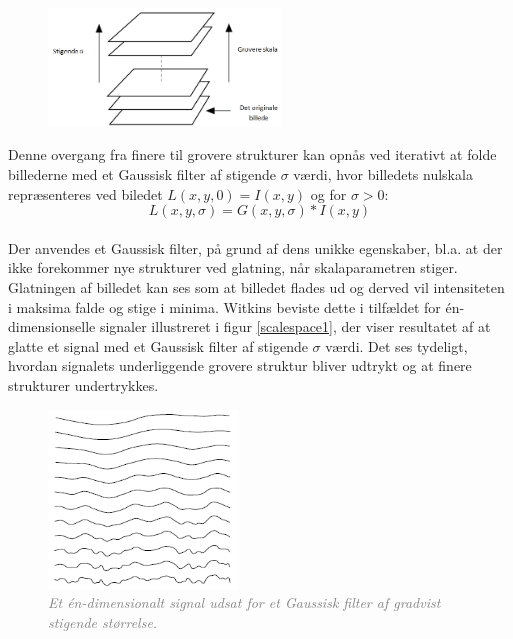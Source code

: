 \begin{figure}[H]
    \centering
    \includegraphics[width=0.55\textwidth]{fig/32.png}
     \vspace{-1em}
    \begin{center}    
       \caption{\textcolor{gray}{\footnotesize \textit{ }}}
    \label{fig:scalerep}
     \end{center}
     \vspace{-2.5em}
  \end{figure} \noindent
Denne overgang fra finere til grovere strukturer kan opnås ved iterativt at folde billederne med et Gaussisk filter af stigende $\sigma$ værdi, hvor billedets nulskala repræsenteres ved biledet $ L(x,y,0) = I(x,y)$ og for $\sigma>0$:
\begin{equation}
L(x,y,\sigma) = G(x,y,\sigma)\ast I(x,y)
\label{scalespace1}
\end{equation}
\\
Der anvendes et Gaussisk filter, på grund af dens unikke egenskaber,  bl.a. at der ikke forekommer nye strukturer ved glatning, når skalaparametren stiger. Glatningen af billedet kan ses som at billedet flades ud og derved vil intensiteten i maksima falde og stige i minima.  Witkins \cite{witkins} beviste dette i tilfældet for én-dimensionselle signaler illustreret i  figur  \ref{scalespace1}, der viser resultatet af at glatte et signal med et Gaussisk filter af stigende $\sigma$ værdi. Det ses tydeligt, hvordan signalets underliggende grovere struktur bliver udtrykt og at finere strukturer undertrykkes.
\begin{figure}[H]
    \centering
    \includegraphics[width=0.45\textwidth]{fig/33.png}
     \vspace{-1em}
    \begin{center}    
       \caption{\textcolor{gray}{\footnotesize \textit{Et én-dimensionalt signal udsat for et Gaussisk filter af gradvist stigende størrelse.}}}
    \label{fig:scalereps}
     \end{center}
     \vspace{-2.5em}
  \end{figure} \noindent
